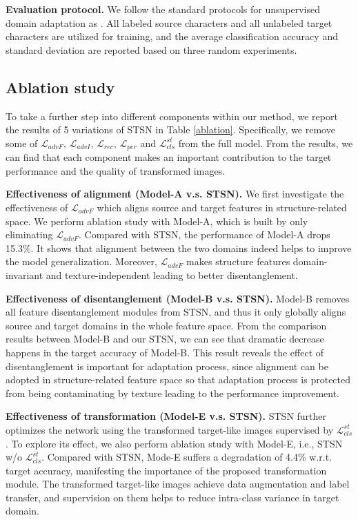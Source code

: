 \documentclass[10pt,journal,compsoc,twocolumn ]{IEEEtran}
\begin{document}
\textbf{Evaluation protocol.} We follow the standard protocols for unsupervised domain adaptation as \cite{Ganin2015Unsupervised,Long2015Learning}. All labeled source characters and all unlabeled target characters are utilized for training, and the average classification accuracy and standard deviation are reported based on three random experiments.


\subsection{Ablation study}

To take a further step into different components within our method, we report the results of 5 variations of STSN in Table \ref{ablation}. Specifically, we remove some of $\mathcal{L}_{advF}$, $\mathcal{L}_{advI}$, $\mathcal{L}_{rec}$, $\mathcal{L}_{per}$ and $\mathcal{L}_{cls}^{st}$ from the full model. From the results, we can find that each component makes an important contribution to the target performance and the quality of transformed images.

\textbf{Effectiveness of alignment (Model-A v.s. STSN).} We first investigate the effectiveness of $\mathcal{L}_{advF}$ which aligns source and target features in structure-related space. We perform ablation study with Model-A, which is built by only eliminating $\mathcal{L}_{advF}$. Compared with STSN, the performance of Model-A drops 15.3\%. It shows that alignment between the two domains indeed helps to improve the model generalization. Moreover, $\mathcal{L}_{advF}$ makes structure features domain-invariant and texture-independent leading to better disentanglement.

\textbf{Effectiveness of disentanglement (Model-B v.s. STSN).} Model-B removes all feature disentanglement modules from STSN, and thus it only globally aligns source and target domains in the whole feature space. From the comparison results between Model-B and our STSN, we can see that dramatic decrease happens in the target accuracy of Model-B. This result reveals the effect of disentanglement is important for adaptation process, since alignment can be adopted in structure-related feature space so that adaptation process is protected from being contaminating by texture leading to the performance improvement.

\textbf{Effectiveness of transformation (Model-E v.s. STSN).} STSN further optimizes the network using the transformed target-like images supervised by $\mathcal{L}_{cls}^{st}$. To explore its effect, we also perform ablation study with Model-E, i.e., STSN w/o $\mathcal{L}_{cls}^{st}$. Compared with STSN, Mode-E suffers a degradation of 4.4\% w.r.t. target accuracy, manifesting the importance of the proposed transformation module. The transformed target-like images achieve data augmentation and label transfer, and supervision on them helps to reduce intra-class variance in target domain.
\end{document}
